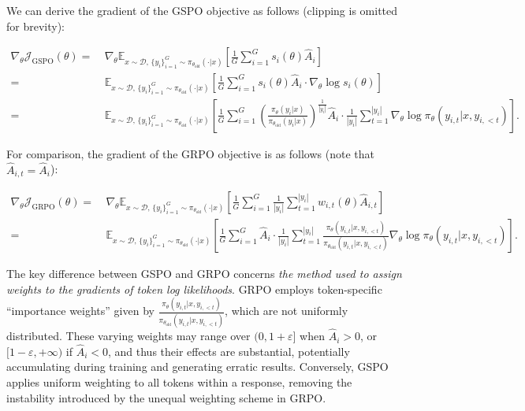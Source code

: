 We can derive the gradient of the GSPO objective as follows (clipping is omitted for brevity):

\begin{align}
\nabla_{\theta} \mathcal{J}_\text{GSPO} (\theta)
=&\ 
\nabla_{\theta} \mathbb{E}_{ x \sim \mathcal{D},\, \{y_i\}_{i=1}^G \sim \pi_{\theta_\text{old}}( \cdot | x) }
\left[ 
\frac{1}{G} \sum_{i=1}^{G} s_{i}(\theta) \widehat{A}_{i}
\right] \\
= &\ 
\mathbb{E}_{ x \sim \mathcal{D},\, \{y_i\}_{i=1}^G \sim \pi_{\theta_\text{old}}( \cdot | x) }
\left[ 
\frac{1}{G} \sum_{i=1}^{G}
s_{i}(\theta) \widehat{A}_{i}
\cdot \nabla_{\theta} \log s_{i}(\theta)
\right] \\
=&\ 
\mathbb{E}_{ x \sim \mathcal{D},\, \{y_i\}_{i=1}^G \sim \pi_{\theta_\text{old}}( \cdot | x) }
\left[ 
\frac{1}{G} \sum_{i=1}^{G} 
\left( \frac{ \pi_{\theta} (y_i | x) }{ \pi_{\theta_\text{old}} (y_i | x)} \right)^{\frac{1}{|y_i|}} \widehat{A}_{i} 
\cdot \frac{1}{|y_i|} \sum_{t=1}^{|y_i|} \nabla_{\theta} \log \pi_{\theta} (y_{i,t} | x, y_{i,<t}) 
\right].
\label{equ:gspo_grad}
\end{align}

For comparison, the gradient of the GRPO objective is as follows (note that $\widehat{A}_{i,t} = \widehat{A}_{i}$):

\begin{align}
\nabla_{\theta} \mathcal{J}_\text{GRPO} (\theta) 
=&\ 
\nabla_{\theta} \mathbb{E}_{ x \sim \mathcal{D},\, \{y_i\}_{i=1}^G \sim \pi_{\theta_\text{old}}( \cdot | x) }
\left[ \frac{1}{G} \sum_{i=1}^{G} \frac{1}{|y_i|} \sum_{t=1}^{|y_i|} 
w_{i,t}(\theta) \widehat{A}_{i,t}
\right] \\
=&\
\mathbb{E}_{ x \sim \mathcal{D},\, \{y_i\}_{i=1}^G \sim \pi_{\theta_\text{old}}( \cdot | x) }
\left[ \frac{1}{G} \sum_{i=1}^{G} \widehat{A}_{i} 
\cdot \frac{1}{|y_i|} \sum_{t=1}^{|y_i|} 
\frac{ \pi_{\theta} (y_{i,t} | x, y_{i,<t}) }{ \pi_{\theta_\text{old}} (y_{i,t} | x,y_{i,<t})} 
\nabla_{\theta} \log \pi_{\theta} (y_{i,t} | x, y_{i,<t})  
\right].
\end{align}

The key difference between GSPO and GRPO concerns \textit{the method used to assign weights to the gradients of token log likelihoods}. GRPO employs token-specific ``importance weights'' given by $\frac{ \pi_{\theta} (y_{i,t} | x, y_{i,<t}) }{ \pi_{\theta_\text{old}} (y_{i,t} | x,y_{i,<t})}$, which are not uniformly distributed. These varying weights may range over $(0, 1+\varepsilon]$ when $\widehat{A}_{i} >0$, or $[1-\varepsilon, +\infty)$ if $\widehat{A}_{i} < 0$, and thus their effects are substantial, potentially accumulating during training and generating erratic results. Conversely, GSPO applies uniform weighting to all tokens within a response, removing the instability introduced by the unequal weighting scheme in GRPO.

